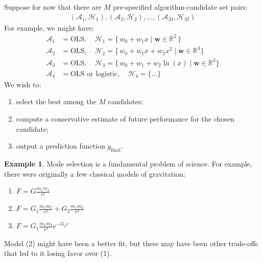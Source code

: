 \documentclass[12pt, a4paper]{article}
\theoremstyle{definition}
\newtheorem*{example}{Example}
\begin{document}
	Suppose for now that there are $M$ pre-specified algorithm-candidate set pairs:
	\begin{align*}
		(\mathcal{A}_1, \mathcal{H}_1), (\mathcal{A}_2,\mathcal{H}_2),\ldots,
		(\mathcal{A}_M, \mathcal{H}_M)
	\end{align*}
	For example, we might have:
	\begin{align*}
		\mathcal{A}_1 &= \text{OLS},\quad \mathcal{H}_1 = \{\, w_0+w_1x \mid \bm{w}\in\mathbb{R}^2 \,\}\\
		\mathcal{A}_2 &= \text{OLS},\quad \mathcal{H}_2 = \{\, w_0+w_1x+w_2x^2\mid \bm{w}\in\mathbb{R}^3\}\\
		\mathcal{A}_3 &= \text{OLS},\quad \mathcal{H}_3 = \{\, w_0+w_1+w_2\ln(x) \mid \bm{w}\in\mathbb{R}^3\}\\
		\mathcal{A}_4 &= \text{OLS or logistic},\quad \mathcal{H}_4 = \{\ldots\}
	\end{align*}
	We wish to:
	\begin{enumerate}[label=(\roman*)]
		\item select the best among the $M$ candidates;
		\item compute a conservative estimate of future performance for the chosen candidate;
		\item output a prediction function $g_{\text{final}}$.
	\end{enumerate}
	\begin{tcolorbox}[breakable]
		\begin{example}
			Mode selection is a fundamental problem of science. For example,
			there were originally a few classical models of gravitation:
			\begin{enumerate}[label=(\arabic*)]
				\item $F = G\frac{m_1m_2}{r^2}$
				\item $F = G_1\frac{m_1m_2}{r^2} + G_2\frac{m_1m_2}{r^3}$
				\item $F = G_1\frac{m_1m_2}{r^2}e^{-G_2r}$
			\end{enumerate}
			Model (2) might have been a better fit, but there may have been
			other trade-offs that led to it losing favor over (1).
		\end{example}
	\end{tcolorbox}
\end{document}
